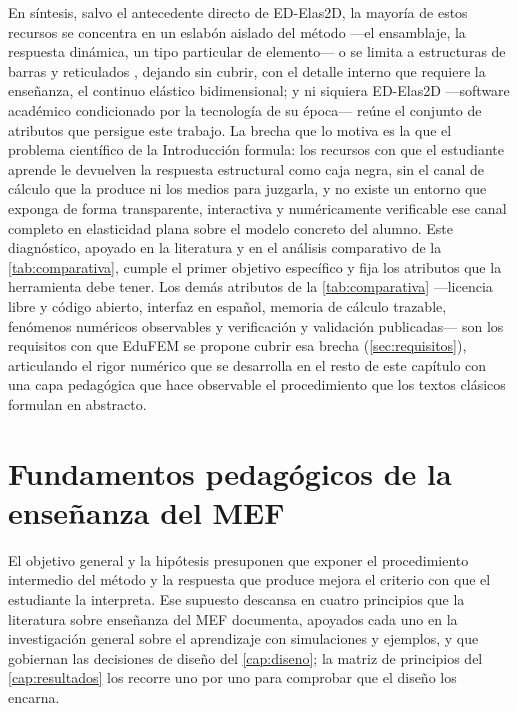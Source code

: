 En síntesis, salvo el antecedente directo de ED-Elas2D, la mayoría de estos recursos se concentra en un eslabón aislado del método —el ensamblaje, la respuesta dinámica, un tipo particular de elemento— o se limita a estructuras de barras y reticulados \autocite[p.~17]{bishay2020teaching}, dejando sin cubrir, con el detalle interno que requiere la enseñanza, el continuo elástico bidimensional; y ni siquiera ED-Elas2D —software académico condicionado por la tecnología de su época— reúne el conjunto de atributos que persigue este trabajo. La brecha que lo motiva es la que el problema científico de la Introducción formula: los recursos con que el estudiante aprende le devuelven la respuesta estructural como caja negra, sin el canal de cálculo que la produce ni los medios para juzgarla, y no existe un entorno que exponga de forma transparente, interactiva y numéricamente verificable ese canal completo en elasticidad plana sobre el modelo concreto del alumno. Este diagnóstico, apoyado en la literatura y en el análisis comparativo de la \autoref{tab:comparativa}, cumple el primer objetivo específico y fija los atributos que la herramienta debe tener. Los demás atributos de la \autoref{tab:comparativa} —licencia libre y código abierto, interfaz en español, memoria de cálculo trazable, fenómenos numéricos observables y verificación y validación publicadas— son los requisitos con que EduFEM se propone cubrir esa brecha (\autoref{sec:requisitos}), articulando el rigor numérico que se desarrolla en el resto de este capítulo con una capa pedagógica que hace observable el procedimiento que los textos clásicos formulan en abstracto.

\section{Fundamentos pedagógicos de la enseñanza del MEF}
\label{sec:fundamentos-pedagogicos}

El objetivo general y la hipótesis presuponen que exponer el procedimiento intermedio del método y la respuesta que produce mejora el criterio con que el estudiante la interpreta. Ese supuesto descansa en cuatro principios que la literatura sobre enseñanza del MEF documenta, apoyados cada uno en la investigación general sobre el aprendizaje con simulaciones y ejemplos, y que gobiernan las decisiones de diseño del \autoref{cap:diseno}; la matriz de principios del \autoref{cap:resultados} los recorre uno por uno para comprobar que el diseño los encarna.

